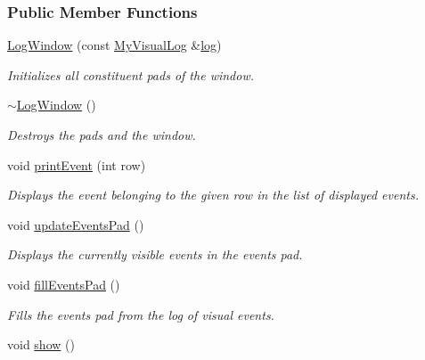 \subsubsection*{Public Member Functions}
\begin{DoxyCompactItemize}
\item 
\hyperlink{structLogWindow_afa65237ac7598fea74b9ddc5defb407e}{Log\+Window} (const \hyperlink{structLogWindow_aac475b6f939a800e22ca9431bade9245}{My\+Visual\+Log} \&\hyperlink{algorithm__log_8h_a56be41e5d18609f6adf769e9c49804da}{log})
\begin{DoxyCompactList}\small\item\em Initializes all constituent pads of the window. \end{DoxyCompactList}\item 
\hyperlink{structLogWindow_a7e78706e54669ec766b0eaceaaf1851a}{$\sim$\+Log\+Window} ()\hypertarget{structLogWindow_a7e78706e54669ec766b0eaceaaf1851a}{}\label{structLogWindow_a7e78706e54669ec766b0eaceaaf1851a}

\begin{DoxyCompactList}\small\item\em Destroys the pads and the window. \end{DoxyCompactList}\item 
void \hyperlink{structLogWindow_a74d1d04aeff69e61663d3bc5e9852e09}{print\+Event} (int row)
\begin{DoxyCompactList}\small\item\em Displays the event belonging to the given row in the list of displayed events. \end{DoxyCompactList}\item 
void \hyperlink{structLogWindow_a19775e7465ef113faccfd569f6040460}{update\+Events\+Pad} ()\hypertarget{structLogWindow_a19775e7465ef113faccfd569f6040460}{}\label{structLogWindow_a19775e7465ef113faccfd569f6040460}

\begin{DoxyCompactList}\small\item\em Displays the currently visible events in the events pad. \end{DoxyCompactList}\item 
void \hyperlink{structLogWindow_ac26d420bc1cb8148b4d3a41112531192}{fill\+Events\+Pad} ()\hypertarget{structLogWindow_ac26d420bc1cb8148b4d3a41112531192}{}\label{structLogWindow_ac26d420bc1cb8148b4d3a41112531192}

\begin{DoxyCompactList}\small\item\em Fills the events pad from the log of visual events. \end{DoxyCompactList}\item 
void \hyperlink{structLogWindow_ae1a8637a579dd53a47ea35331adb49b1}{show} ()\hypertarget{structLogWindow_ae1a8637a579dd53a47ea35331adb49b1}{}\label{structLogWindow_ae1a8637a579dd53a47ea35331adb49b1}


\end{DoxyCompactItemize}
